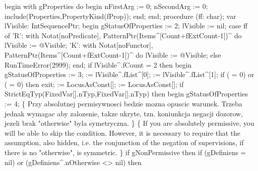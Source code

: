 begin
   with gProperties do
   begin
      nFirstArg := 0;
      nSecondArg := 0;
      include(Properties,PropertyKind(fProp));
   end;
end;
\eatline
{}\nwendcode{}\nwdocspar
\nwenddocs{}\endmoddef\nwstartdeflinemarkup{}\nwenddeflinemarkup
procedure (ff: char);
var
   lVisible: IntSequencePtr;
begin
   gStatusOfProperties := 2;
   lVisible := nil;
   case ff of
      'R':
         with Notat[noPredicate], PatternPtr(Items^[Count+fExtCount-1])^ do
                                     lVisible := @Visible;
      'K':
         with Notat[noFunctor], PatternPtr(Items^[Count+fExtCount-1])^ do
                                   lVisible := @Visible;
      else RunTimeError(2999);
   end;
   if lVisible^.fCount = 2 then
   begin
      gStatusOfProperties := 3;
       := lVisible^.fList^[0];
       := lVisible^.fList^[1];
      if ( = 0) or ( = 0) then exit;
       := LocusAsConst[];
       := LocusAsConst[];
      if StrictEqTyp(FixedVar[].nTyp,FixedVar[].nTyp) then
      begin
         gStatusOfProperties := 4;
      \{ Przy absolutnej permisywnosci bedzie mozna opuscic
        warunek. Trzeba jednak wymagac aby zalozenie, takze
        ukryte, tzn. koniunkcja negacji dozorow, jezeli
        brak "otherwise" byla symetryczna.
      \}
      \{ If you are absolutely permissive, you will be able to skip
        the condition. However, it is necessary to require that the assumption, also
        hidden, i.e. the conjunction of the negation of supervisions, if
        there is no "otherwise", is symmetric.
      \}
         if gNonPermissive then
            if (gDefiniens = nil) or (gDefiniens^.nOtherwise <> nil) then
